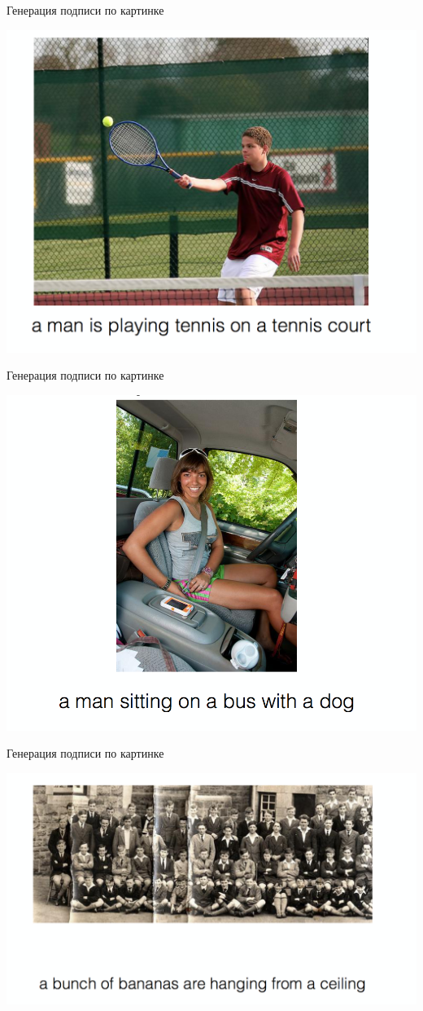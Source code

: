\documentclass[notes,12pt, aspectratio=169]{beamer}
\begin{document}
\begin{frame}{Генерация подписи по картинке}
\begin{center}
	\includegraphics[width=.6\linewidth]{pic_text_ex1.png}
\end{center}
\end{frame}


\begin{frame}{Генерация подписи по картинке}
\begin{center}
	\includegraphics[width=.6\linewidth]{pic_text_ex2.png}
\end{center}
\end{frame}


\begin{frame}{Генерация подписи по картинке}
\begin{center}
	\includegraphics[width=.8\linewidth]{pic_text_ex3.png}
\end{center}
\end{frame}
\end{document}
